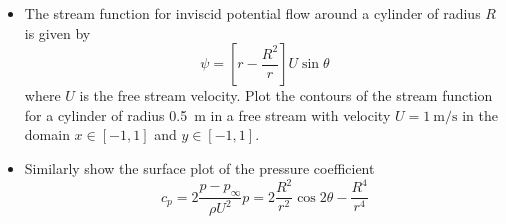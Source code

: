 \begin{frame}
    \begin{exercise}
        \begin{itemize}
            \item The stream function for inviscid potential flow around a cylinder of radius $R$ is given by
            \begin{equation*}
                \psi = \left[ r - \frac{R^2}{r} \right] U \sin \theta
            \end{equation*}
            where $U$ is the free stream velocity. Plot the contours of the stream function for a cylinder of radius \SI{0.5}{\meter} in a free stream with velocity $U=\SI{1}{\meter\per\second}$ in the domain $x \in [-1,1]$ and $y \in [-1,1]$.\\
            \item<2-> Similarly show the surface plot of the pressure coefficient
            \begin{equation*}
                c_p = 2\frac{p-p_\infty}{\rho U^2}p = 2\frac{R^2}{r^2} \cos 2\theta - \frac{R^4}{r^4}
            \end{equation*}
        \end{itemize}
    \end{exercise}
\end{frame}

